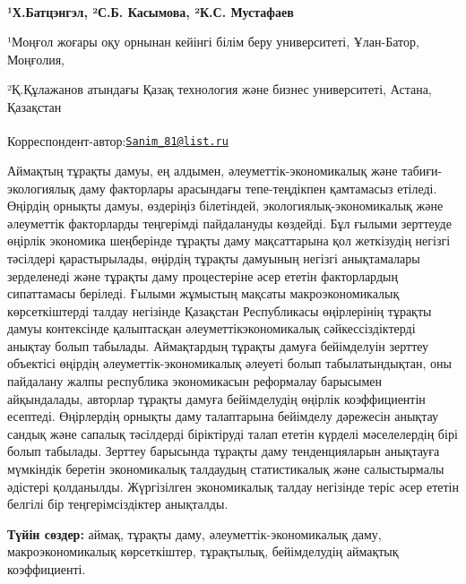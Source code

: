 
\begin{articleheader}

{\bfseries ¹Х.Батцэнгэл\textsuperscript{\envelope }, ²С.Б. Касымова, ²К.С.
Мустафаев}
\end{articleheader}
\begin{affiliation}
¹Моңғол жоғары оқу орнынан кейінгі білім беру университеті, Ұлан-Батор,
Моңғолия,

²Қ.Құлажанов атындағы Қазақ технология және бизнес университеті, Астана,
Қазақстан

\raggedright {\bfseries \textsuperscript{\envelope }}Корреспондент-автор:\href{mailto:Sanim_81@list.ru}{\nolinkurl{Sanim\_81@list.ru}}
\end{affiliation}

Аймақтың тұрақты дамуы, ең алдымен, әлеуметтік-экономикалық және
табиғи-экологиялық даму факторлары арасындағы тепе-теңдікпен қамтамасыз
етіледі. Өңірдің орнықты дамуы, өздеріңіз білетіндей,
экологиялық-экономикалық және әлеуметтік факторларды теңгерімді
пайдалануды көздейді. Бұл ғылыми зерттеуде өңірлік экономика шеңберінде
тұрақты даму мақсаттарына қол жеткізудің негізгі тәсілдері
қарастырылады, өңірдің тұрақты дамуының негізгі анықтамалары зерделенеді
және тұрақты даму процестеріне әсер ететін факторлардың сипаттамасы
беріледі. Ғылыми жұмыстың мақсаты макроэкономикалық көрсеткіштерді
талдау негізінде Қазақстан Республикасы өңірлерінің тұрақты дамуы
контексінде қалыптасқан әлеуметтік\-экономикалық сәйкессіздіктерді
анықтау болып табылады. Аймақтардың тұрақты дамуға бейімделуін зерттеу
объектісі өңірдің әлеуметтік-экономикалық әлеуеті болып табылатындықтан,
оны пайдалану жалпы республика экономикасын реформалау барысымен
айқындалады, авторлар тұрақты дамуға бейімделудің өңірлік коэффициентін
есептеді. Өңірлердің орнықты даму талаптарына бейімделу дәрежесін
анықтау сандық және сапалық тәсілдерді біріктіруді талап ететін күрделі
мәселелердің бірі болып табылады. Зерттеу барысында тұрақты даму
тенденцияларын анықтауға мүмкіндік беретін экономикалық талдаудың
статистикалық және салыстырмалы әдістері қолданылды. Жүргізілген
экономикалық талдау негізінде теріс әсер ететін белгілі бір
теңгерімсіздіктер анықталды.

{\bfseries Түйін сөздер:} аймақ, тұрақты даму, әлеуметтік-экономикалық
даму, макроэкономикалық көрсеткіштер, тұрақтылық, бейімделудің аймақтық
коэффициенті.


